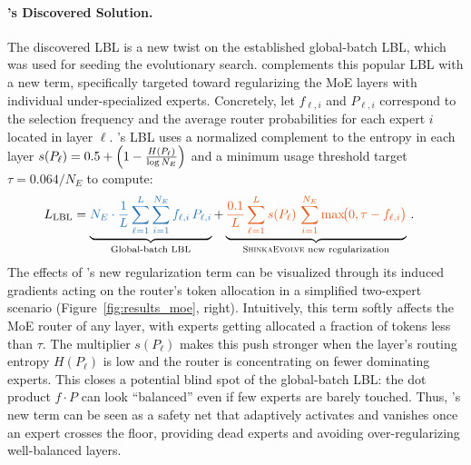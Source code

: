 \paragraph{\ouralgo's Discovered Solution.} The discovered LBL is a new twist on the established global-batch LBL, which was used for seeding the evolutionary search. \ouralgo complements this popular LBL with a new term, specifically targeted toward regularizing the MoE layers with individual under-specialized experts. Concretely, let $f_{\ell, i}$ and $P_{\ell, i}$ correspond to the selection frequency and the average router probabilities for each expert $i$ located in layer $\ell$. \ouralgo's LBL uses a normalized complement to the entropy in each layer $s(P_\ell)=0.5 + \Bigl(1-\frac{H(P_\ell)}{\log N_E}\Bigr)$ and a minimum usage threshold target $\tau = 0.064/{N_E}$ to compute:
\begin{equation}
\label{eq:discovered_lbl_colored}
\begin{aligned}
L_{\mathrm{LBL}}
&=
\underbrace{%
\color{lblA} N_E \cdot \frac{1}{L}
\sum_{\ell=1}^{L}\sum_{i=1}^{N_E} f_{\ell,i}\,P_{\ell,i}
}_{\text{Global-batch LBL}}+
\underbrace{%
\color{lblB} \frac{0.1}{L}\sum_{\ell=1}^{L}
s(P_\ell)\,\sum_{i=1}^{N_E}\max\!\bigl(0,\tau-f_{\ell,i}\bigr)
}_{\text{\ouralgo new regularization}} \, .
\end{aligned}
\end{equation}
The effects of \ouralgo's new regularization term can be visualized through its induced gradients acting on the router's token allocation in a simplified two-expert scenario (Figure~\ref{fig:results_moe}, right). Intuitively, this term softly affects the MoE router of any layer, with experts getting allocated a fraction of tokens less than $\tau$. The multiplier $s(P_\ell)$ makes this push stronger when the layer's routing entropy $H(P_\ell)$ is low and the router is concentrating on fewer dominating experts. This closes a potential blind spot of the global-batch LBL: the dot product $f\!\cdot\!P$ can look ``balanced'' even if few experts are barely touched. Thus, \ouralgo's new term can be seen as a safety net that adaptively activates and vanishes once an expert crosses the floor, providing dead experts and avoiding over-regularizing well-balanced layers.
